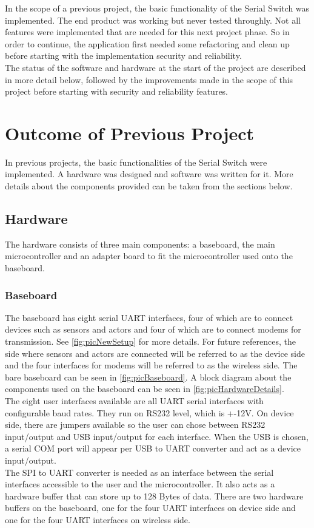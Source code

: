 %
In the scope of a previous project, the basic functionality of the Serial Switch was implemented. The end product was working but never tested throughly. Not all features were implemented that are needed for this next project phase. So in order to continue, the application first needed some refactoring and clean up before starting with the implementation security and reliability.\\
The status of the software and hardware at the start of the project are described in more detail below, followed by the improvements made in the scope of this project before starting with security and reliability features.
%
%
\section{Outcome of Previous Project}
In previous projects, the basic functionalities of the Serial Switch were implemented. A hardware was designed and software was written for it. More details about the components provided can be taken from the sections below.
%
\subsection{Hardware}
The hardware consists of three main components: a baseboard, the main microcontroller and an adapter board to fit the microcontroller used onto the baseboard.
%
\subsubsection{Baseboard}
%
%
The baseboard has eight serial UART interfaces, four of which are to connect devices such as sensors and actors and four of which are to connect modems for transmission. See \autoref{fig:picNewSetup} for more details. For future references, the side where sensors and actors are connected will be referred to as the device side and the four interfaces for modems will be referred to as the wireless side. The bare baseboard can be seen in \autoref{fig:picBaseboard}. A block diagram about the components used on the baseboard can be seen in \autoref{fig:picHardwareDetails}.\\
The eight user interfaces available are all UART serial interfaces with configurable baud rates. They run on RS232 level, which is +-12V. On device side, there are jumpers available so the user can chose between RS232 input/output and USB input/output for each interface. When the USB is chosen, a serial COM port will appear per USB to UART converter and act as a device input/output.\\
The SPI to UART converter is needed as an interface between the serial interfaces accessible to the user and the microcontroller. It also acts as a hardware buffer that can store up to 128 Bytes of data. There are two hardware buffers on the baseboard, one for the four UART interfaces on device side and one for the four UART interfaces on wireless side.
%
